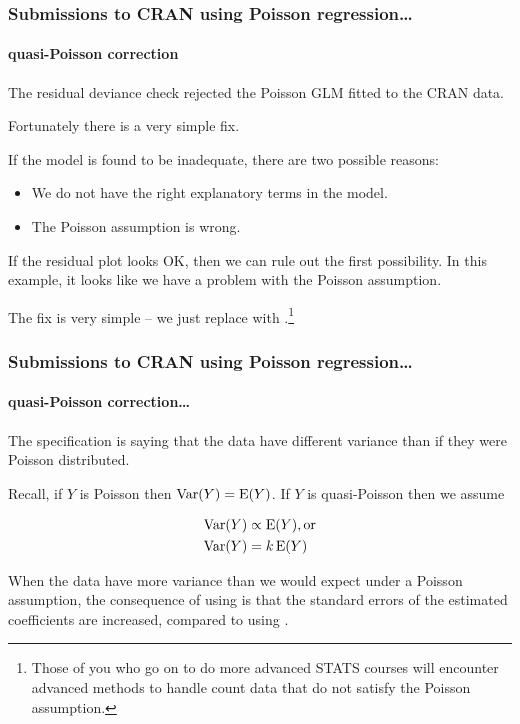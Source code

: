 \documentclass{beamer}\usepackage[]{graphicx}\usepackage[]{xcolor}
\begin{document}
\begin{frame}[fragile]
\frametitle{Submissions to CRAN using Poisson regression\ldots}
\framesubtitle{quasi-Poisson correction}
The residual deviance check rejected the Poisson GLM fitted to the CRAN data.
\medskip

Fortunately there is a very simple fix.
\medskip

If the model is found to be inadequate, there are two possible reasons:

\begin{itemize}
\item We do not have the right explanatory terms in the model.
\item The Poisson assumption is wrong.
\end{itemize}

\medskip

If the residual plot looks OK, then we can rule out the first possibility. In this example, it looks like we have a problem with the Poisson assumption.

\medskip

The fix is very simple -- we just replace  with .\footnote{Those of you who go on to do more advanced STATS courses will encounter advanced methods to handle count data that do not satisfy the Poisson assumption.}
\end{frame}


\begin{frame}[fragile]
\frametitle{Submissions to CRAN using Poisson regression\ldots}
\framesubtitle{quasi-Poisson correction\ldots}

The  specification is saying that the data have different variance than if they were Poisson distributed.

\medskip

Recall, if $Y$ is Poisson then $\operatorname*{Var}(Y) = \operatorname{E}(Y)$. If $Y$ is quasi-Poisson then we assume

\vspace{-1em}

\begin{align}
  \operatorname*{Var}(Y) &\propto \operatorname{E}(Y), \text{or} \nonumber \\
  \operatorname*{Var}(Y) &= k \operatorname{E}(Y) \nonumber
\end{align}

When the data have more variance than we would expect under a Poisson assumption, the consequence of using  is that the standard errors of the estimated coefficients are increased, compared to using .

\end{frame}
\end{document}
